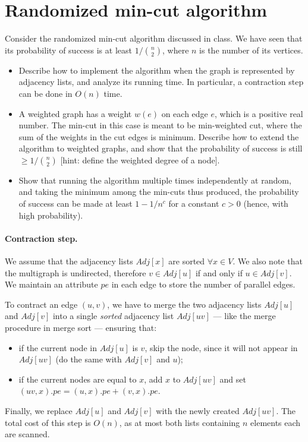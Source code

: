 \section{Randomized min-cut algorithm}

Consider the randomized min-cut algorithm discussed in class. We have seen that its probability of success is at least $1/{n \choose 2}$, where $n$ is the number of its vertices.
\begin{itemize}
  \item Describe how to implement the algorithm when the graph is represented by adjacency lists, and analyze its running time. In particular, a contraction step can be done in $O(n)$ time.
  \item A weighted graph has a weight $w(e)$ on each edge $e$, which is a positive real number. The min-cut in this case is meant to be min-weighted cut, where the sum of the weights in the cut edges is minimum. Describe how to extend the algorithm to weighted graphs, and show that the probability of success is still $\geq 1/{n \choose 2}$ [hint: define the weighted degree of a node].
  \item Show that running the algorithm multiple times independently at random, and taking the minimum among the min-cuts thus produced, the probability of success can be made at least $1 - 1/n^c$ for a constant $c > 0$ (hence, with high probability).
\end{itemize}

\vspace{0.5cm}
\paragraph{Contraction step.} We assume that the adjacency lists $Adj[x]$ are sorted $\forall x \in V$. We also note that the multigraph is undirected, therefore $v\in Adj[u]$ if and only if $u\in Adj[v]$. We maintain an attribute $pe$ in each edge to store the number of parallel edges.

To contract an edge $(u, v)$, we have to merge the two adjacency lists $Adj[u]$ and $Adj[v]$ into a single \emph{sorted} adjacency list $Adj[uv]$ --- like the merge procedure in merge sort --- ensuring that:
\begin{itemize}
  \item if the current node in $Adj[u]$ is $v$, skip the node, since it will not appear in $Adj[uv]$ (do the same with $Adj[v]$ and $u$);
  \item if the current nodes are equal to $x$, add $x$ to $Adj[uv]$ and set $(uv, x).pe = (u,x).pe + (v,x).pe$.
\end{itemize}
Finally, we replace $Adj[u]$ and $Adj[v]$ with the newly created $Adj[uv]$. The total cost of this step is $O(n)$, as at most both lists containing $n$ elements each are scanned.

